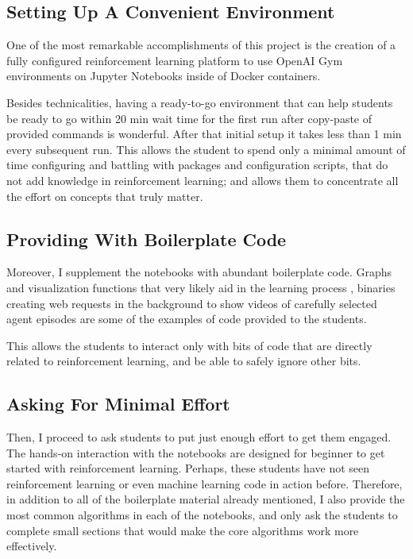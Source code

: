 \documentclass[11pt]{article} %
\begin{document}
\subsection{Setting Up A Convenient Environment}

One of the most remarkable accomplishments of this project is the creation
of a fully configured reinforcement learning platform to use OpenAI
Gym \cite{openaigym} environments on Jupyter Notebooks inside of Docker
containers.

Besides technicalities, having a ready-to-go environment that can help
students be ready to go within 20 min wait time for the first run after
copy-paste of provided commands is wonderful. After that initial setup
it takes less than 1 min every subsequent run. This allows the student to spend
only a minimal amount of time configuring and battling with packages and configuration
scripts, that do not add knowledge in reinforcement learning; and allows them to concentrate
 all the effort on concepts that truly matter.

\subsection{Providing With Boilerplate Code}

Moreover, I supplement the notebooks with abundant boilerplate code. Graphs and
visualization functions that very likely aid in the learning process \cite{visualization},
binaries creating web requests in the background to show videos of carefully
selected agent episodes are some of the examples of
code provided to the students.

This allows the students to interact only with bits of code that are directly
related to reinforcement learning, and be able to safely ignore other bits.

\subsection{Asking For Minimal Effort}

Then, I proceed to ask students to put just enough effort to get them engaged.
The hands-on interaction with the notebooks are designed for beginner to get
started with reinforcement learning. Perhaps, these students have not seen
reinforcement learning or even machine learning code in action before. Therefore,
in addition to all of the boilerplate material already mentioned, I also
provide the most common algorithms in each of the notebooks, and
only ask the students to complete small sections that would make the core
algorithms work more effectively.
\end{document}
